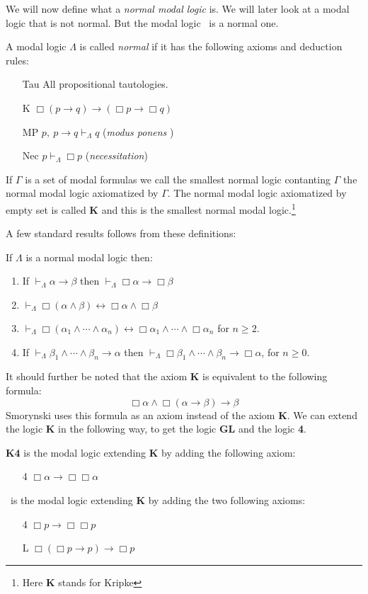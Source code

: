 \documentclass[../main.tex]{subfiles}
\begin{document}
We will now define what a \textit{normal modal logic} is. We will later look at
a modal logic that is not normal. But the modal logic \GL\ is a normal one.
\begin{defi}
	A modal logic $\Lambda$ is called \textit{normal} if it has the following
	axioms and deduction rules:
	\begin{enumerate}
		\item[Tau] All propositional tautologies. 
		\item[K] $\Box(p\rightarrow q)\rightarrow(\Box p\rightarrow\Box
			q)$
		\item[MP] $p,\ p\rightarrow q \vdash_\Lambda q$
			(\textit{modus ponens} )
		\item[Nec] $p \vdash_\Lambda\Box p$ (\textit{necessitation})
	\end{enumerate}
	If $\Gamma$ is a set of modal formulas we call the smallest normal
	logic contanting $\Gamma$ the normal modal logic axiomatized by
	$\Gamma$. The normal modal logic axiomatized by empty set is called
	\textbf{K} and
	this is the smallest normal modal logic.\footnote{Here \textbf{K}
	stands for Kripke}
\end{defi}
A few standard results follows from these definitions:
\begin{prop}
	If $\Lambda$ is a normal modal logic then:
	\begin{enumerate}
		\item If $\vdash_\Lambda\alpha\rightarrow\beta$ then
		$\vdash_\Lambda\Box\alpha\rightarrow\Box\beta$
	\item
		$\vdash_\Lambda\Box(\alpha\wedge\beta)\leftrightarrow\Box\alpha\wedge\Box\beta$
	\item
		$\vdash_\Lambda\Box(\alpha_1\wedge\cdots\wedge\alpha_n)\leftrightarrow
		\Box\alpha_1\wedge\cdots\wedge\Box\alpha_n$ for $n\geq 2$.
	\item If
		$\vdash_\Lambda\beta_1\wedge\cdots\wedge\beta_n\rightarrow\alpha$
		then
		$\vdash_\Lambda\Box\beta_1\wedge\cdots\wedge\beta_n\rightarrow\Box\alpha$,
		for $n\geq 0$.
	\end{enumerate}
\end{prop}
It should further be noted that the axiom \textbf{K} is equivalent to the
following formula:
\[\Box\alpha\wedge\Box(\alpha\rightarrow\beta)\rightarrow\beta\]
Smorynski uses this formula as an axiom instead of the axiom \textbf{K}.
We can extend the logic \textbf{K} in the following way, to get the logic
\textbf{GL} and the logic \textbf{4}.
\begin{defi}
	\textbf{K4} is the modal logic extending \textbf{K} by adding the
	following axiom:
	\begin{enumerate}
		\item[4] $\Box\alpha\rightarrow\Box\Box\alpha$
	\end{enumerate}
	\GL\ is the modal logic extending \textbf{K} by adding the two following
	axioms:
	\begin{enumerate}
		\item[4] $\Box p\rightarrow\Box\Box p$
		\item[L]
			$\Box(\Box p\rightarrow p)\rightarrow\Box p$
	\end{enumerate}
\end{defi}
\end{document}
